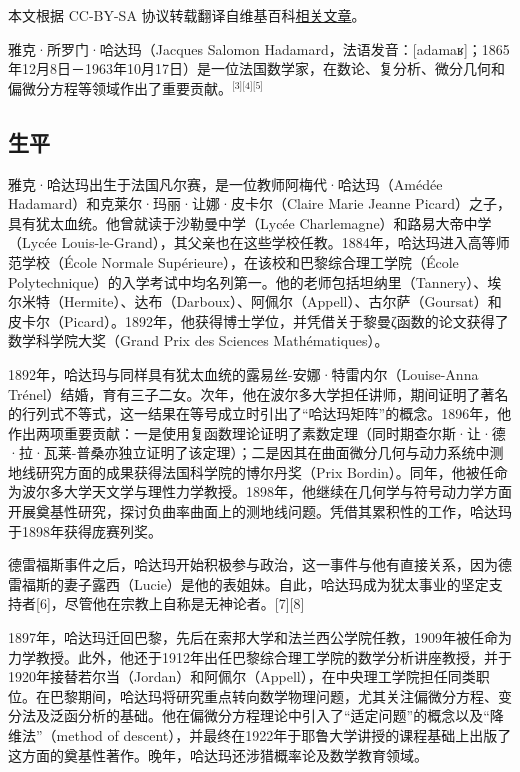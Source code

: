 
本文根据 CC-BY-SA 协议转载翻译自维基百科\href{https://en.wikipedia.org/wiki/Jacques_Hadamard}{相关文章}。

雅克·所罗门·哈达玛（Jacques Salomon Hadamard，法语发音：[adamaʁ]；1865年12月8日－1963年10月17日）是一位法国数学家，在数论、复分析、微分几何和偏微分方程等领域作出了重要贡献。\(^\text{[3][4][5]}\)
\subsection{生平}
雅克·哈达玛出生于法国凡尔赛，是一位教师阿梅代·哈达玛（Amédée Hadamard）和克莱尔·玛丽·让娜·皮卡尔（Claire Marie Jeanne Picard）之子，具有犹太血统。他曾就读于沙勒曼中学（Lycée Charlemagne）和路易大帝中学（Lycée Louis-le-Grand），其父亲也在这些学校任教。1884年，哈达玛进入高等师范学校（École Normale Supérieure），在该校和巴黎综合理工学院（École Polytechnique）的入学考试中均名列第一。他的老师包括坦纳里（Tannery）、埃尔米特（Hermite）、达布（Darboux）、阿佩尔（Appell）、古尔萨（Goursat）和皮卡尔（Picard）。1892年，他获得博士学位，并凭借关于黎曼ζ函数的论文获得了数学科学院大奖（Grand Prix des Sciences Mathématiques）。

1892年，哈达玛与同样具有犹太血统的露易丝-安娜·特雷内尔（Louise-Anna Trénel）结婚，育有三子二女。次年，他在波尔多大学担任讲师，期间证明了著名的行列式不等式，这一结果在等号成立时引出了“哈达玛矩阵”的概念。1896年，他作出两项重要贡献：一是使用复函数理论证明了素数定理（同时期查尔斯·让·德·拉·瓦莱-普桑亦独立证明了该定理）；二是因其在曲面微分几何与动力系统中测地线研究方面的成果获得法国科学院的博尔丹奖（Prix Bordin）。同年，他被任命为波尔多大学天文学与理性力学教授。1898年，他继续在几何学与符号动力学方面开展奠基性研究，探讨负曲率曲面上的测地线问题。凭借其累积性的工作，哈达玛于1898年获得庞赛列奖。

德雷福斯事件之后，哈达玛开始积极参与政治，这一事件与他有直接关系，因为德雷福斯的妻子露西（Lucie）是他的表姐妹。自此，哈达玛成为犹太事业的坚定支持者[6]，尽管他在宗教上自称是无神论者。[7][8]

1897年，哈达玛迁回巴黎，先后在索邦大学和法兰西公学院任教，1909年被任命为力学教授。此外，他还于1912年出任巴黎综合理工学院的数学分析讲座教授，并于1920年接替若尔当（Jordan）和阿佩尔（Appell），在中央理工学院担任同类职位。在巴黎期间，哈达玛将研究重点转向数学物理问题，尤其关注偏微分方程、变分法及泛函分析的基础。他在偏微分方程理论中引入了“适定问题”的概念以及“降维法”（method of descent），并最终在1922年于耶鲁大学讲授的课程基础上出版了这方面的奠基性著作。晚年，哈达玛还涉猎概率论及数学教育领域。

